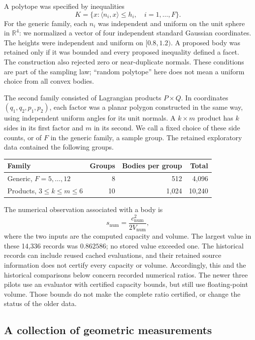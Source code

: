 A polytope was specified by inequalities
\[
 K=\{x:\langle n_i,x\rangle\leq h_i,\quad i=1,\ldots,F\}.
\]
For the generic family, each $n_i$ was independent and uniform on the unit
sphere in $\mathbb R^4$: we normalized a vector of four independent standard
Gaussian coordinates. The heights were independent and uniform on
$[0.8,1.2)$. A proposed body was retained only if it was bounded and every
proposed inequality defined a facet. The construction also rejected zero or
near-duplicate normals. These conditions are part of the sampling law;
``random polytope'' here does not mean a uniform choice from all convex bodies.

The second family consisted of Lagrangian products $P\times Q$. In coordinates
$(q_1,q_2,p_1,p_2)$, each factor was a planar polygon constructed in the same
way, using independent uniform angles for its unit normals. A $k\times m$
product has $k$ sides in its first factor and $m$ in its second. We call a
fixed choice of these side counts, or of $F$ in the generic family, a sample
group. The retained exploratory data contained the following groups.
\begin{center}
\begin{tabular}{lrrr}
\hline
Family & Groups & Bodies per group & Total\\
\hline
Generic, $F=5,\ldots,12$ & 8 & 512 & 4,096\\
Products, $3\leq k\leq m\leq6$ & 10 & 1,024 & 10,240\\
\hline
\end{tabular}
\end{center}

The numerical observation associated with a body is
\[
 s_{\mathrm{num}}=\frac{c_{\mathrm{num}}^2}{2V_{\mathrm{num}}},
\]
where the two inputs are the computed capacity and volume. The largest value
in these 14,336 records was $0.862586$; no stored value exceeded one.
The historical records can include reused cached evaluations, and their
retained source information does not certify every capacity or volume.
Accordingly, this and the historical comparisons below concern recorded
numerical ratios. The newer three pilots use an evaluator with certified
capacity bounds, but still use floating-point volume. Those bounds do not
make the complete ratio certified, or change the status of the older data.

\subsection{A collection of geometric measurements}

